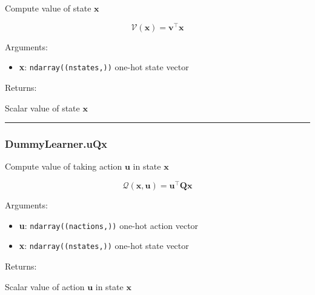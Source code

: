 \begin{Shaded}
\begin{Highlighting}[]
\end{Highlighting}
\end{Shaded}

Compute value of state \(\mathbf x\)

\[
\mathcal V(\mathbf x) = \mathbf v^\top \mathbf x
\]

Arguments:

\begin{itemize}
\tightlist
\item
  \textbf{x}: \texttt{ndarray((nstates,))} one-hot state vector
\end{itemize}

Returns:

Scalar value of state \(\mathbf x\)

\begin{center}\rule{0.5\linewidth}{\linethickness}\end{center}

\hypertarget{dummylearner.uqx}{%
\subsubsection{DummyLearner.uQx}\label{dummylearner.uqx}}

\begin{Shaded}
\begin{Highlighting}[]
\end{Highlighting}
\end{Shaded}

Compute value of taking action \(\mathbf u\) in state \(\mathbf x\)

\[
\mathcal Q(\mathbf x, \mathbf u) = \mathbf u^\top \mathbf Q \mathbf x
\]

Arguments:

\begin{itemize}
\tightlist
\item
  \textbf{u}: \texttt{ndarray((nactions,))} one-hot action vector
\item
  \textbf{x}: \texttt{ndarray((nstates,))} one-hot state vector
\end{itemize}

Returns:

Scalar value of action \(\mathbf u\) in state \(\mathbf x\)

